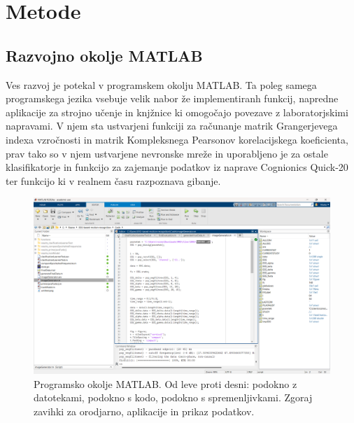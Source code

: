\chapter{Metode}

\section{Razvojno okolje MATLAB}
Ves razvoj je potekal v programskem okolju MATLAB. Ta poleg samega programskega jezika vsebuje velik nabor že implementiranh funkcij, napredne aplikacije za strojno učenje in knjžnice ki omogočajo povezave z laboratorjskimi napravami. V njem sta ustvarjeni funkciji za računanje matrik Grangerjevega indexa vzročnosti
in matrik Kompleksnega Pearsonov korelacijskega koeficienta, prav tako so v njem ustvarjene nevronske mreže in uporabljeno je za ostale klasifikatorje in funkcijo za zajemanje podatkov iz naprave Cognionics Quick-20 ter funkcijo ki v realnem času razpoznava gibanje.
\begin{figure}[h!]
    \begin{center}
    \includegraphics[width=1\linewidth]{slike/Matlab.png}
    \end{center}
    \caption{Programsko okolje MATLAB. Od leve proti desni: podokno z datotekami, podokno s kodo, podokno s spremenljivkami. Zgoraj zavihki za orodjarno, aplikacije in prikaz podatkov.}
    \end{figure}
    
